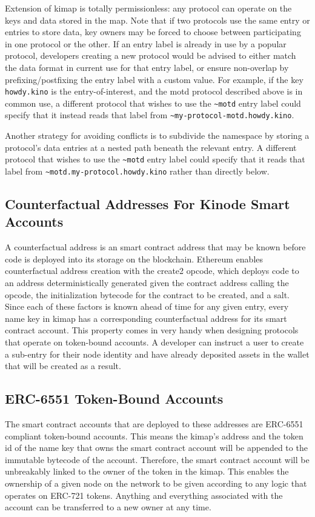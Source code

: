 \documentclass[runningheads]{llncs}
\begin{document}
Extension of kimap is totally permissionless: any protocol can operate on the keys and data stored in the map.
Note that if two protocols use the same entry or entries to store data, key owners may be forced to choose between participating in one protocol or the other.
If an entry label is already in use by a popular protocol, developers creating a new protocol would be advised to either match the data format in current use for that entry label, or ensure non-overlap by prefixing/postfixing the entry label with a custom value.
For example, if the key \verb|howdy.kino| is the entry-of-interest, and the motd protocol described above is in common use, a different protocol that wishes to use the \verb|~motd| entry label could specify that it instead reads that label from \verb|~my-protocol-motd.howdy.kino|.

Another strategy for avoiding conflicts is to subdivide the namespace by storing a protocol's data entries at a nested path beneath the relevant entry.
A different protocol that wishes to use the \verb|~motd| entry label could specify that it reads that label from \verb|~motd.my-protocol.howdy.kino| rather than directly below.

\subsection{Counterfactual Addresses For Kinode Smart Accounts}

A counterfactual address is an smart contract address that may be known before code is deployed into its storage on the blockchain.
Ethereum enables counterfactual address creation with the create2 opcode, which deploys code to an address deterministically generated given the contract address calling the opcode, the initialization bytecode for the contract to be created, and a salt.
Since each of these factors is known ahead of time for any given entry, every name key in kimap has a corresponding counterfactual address for its smart contract account.
This property comes in very handy when designing protocols that operate on token-bound accounts.
A developer can instruct a user to create a sub-entry for their node identity and have already deposited assets in the wallet that will be created as a result.

\subsection{ERC-6551 Token-Bound Accounts}

The smart contract accounts that are deployed to these addresses are ERC-6551 compliant token-bound accounts.
This means the kimap's address and the token id of the name key that owns the smart contract account will be appended to the immutable bytecode of the account.
Therefore, the smart contract account will be unbreakably linked to the owner of the token in the kimap.
This enables the ownership of a given node on the network to be given according to any logic that operates on ERC-721 tokens.
Anything and everything associated with the account can be transferred to a new owner at any time.
\end{document}
